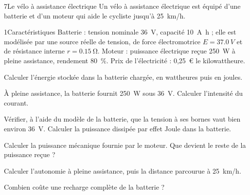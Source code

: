

\begin{exoBac}{7}{Le vélo à assistance électrique}
Un vélo à assistance électrique est équipé d'une batterie et d'un moteur qui aide le cycliste jusqu'à \qty{25}{km/h}.
\begin{docu}{1}{Caractéristiques}
Batterie : tension nominale \qty{36}{V}, capacité \qty{10}{A.h} ; elle est modélisée par une source réelle de tension, de force
électromotrice $E=\qty{37,0}{V}$ et de résistance interne $r=\qty{0,15}{\ohm}$. Moteur : puissance électrique reçue \qty{250}{W} à pleine
assistance, rendement \qty{80}{\percent}. Prix de l'électricité : 0,25~€ le kilowattheure.
\end{docu}
\begin{questions}
\item Calculer l'énergie stockée dans la batterie chargée, en wattheures puis en joules.
\item À pleine assistance, la batterie fournit \qty{250}{W} sous \qty{36}{V}. Calculer l'intensité du courant.
\item Vérifier, à l'aide du modèle de la batterie, que la tension à ses bornes vaut bien environ \qty{36}{V}. Calculer la puissance
dissipée par effet Joule dans la batterie.
\item Calculer la puissance mécanique fournie par le moteur. Que devient le reste de la puissance reçue ?
\item Calculer l'autonomie à pleine assistance, puis la distance parcourue à \qty{25}{km/h}.
\item Combien coûte une recharge complète de la batterie ?
\end{questions}
\end{exoBac}

